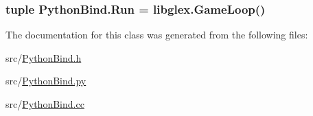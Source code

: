 \subsubsection[{Run}]{\setlength{\rightskip}{0pt plus 5cm}tuple Python\+Bind.\+Run = libglex.\+Game\+Loop()}\label{class_python_bind_a58a0da72b60d10ef74d6d572b158d30a}


The documentation for this class was generated from the following files\+:\begin{DoxyCompactItemize}
\item 
src/\hyperlink{_python_bind_8h}{Python\+Bind.\+h}\item 
src/\hyperlink{_python_bind_8py}{Python\+Bind.\+py}\item 
src/\hyperlink{_python_bind_8cc}{Python\+Bind.\+cc}\end{DoxyCompactItemize}
